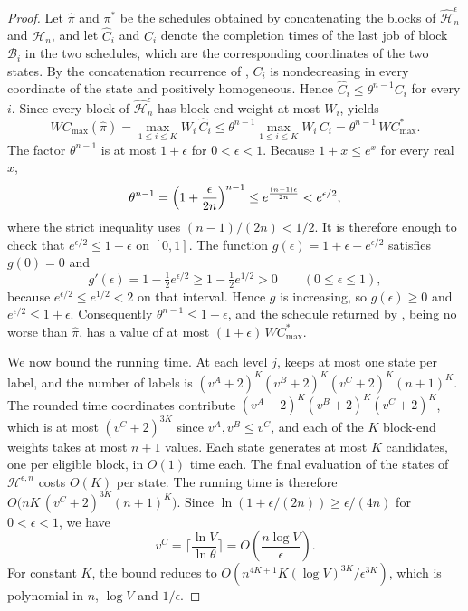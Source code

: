 ﻿\documentclass[12pt]{article}
\begin{document}
\begin{sloppypar}
\begin{proof}
Let $\hat\pi$ and $\pi^{*}$ be the schedules obtained by concatenating the blocks of
$\hat{\mathscr{H}}^{\epsilon}_{n}$ and $\mathscr{H}_{n}$, and let $\hat C_i$ and $C_i$ denote the
completion times of the last job of block $\mathcal{B}_i$ in the two schedules, which are the
corresponding coordinates of the two states. By the concatenation
recurrence of , $C_i$ is nondecreasing in every coordinate
of the state and positively homogeneous. Hence $\hat C_i\le\theta^{n-1}C_i$ for
every $i$. Since every block of $\hat{\mathscr{H}}^{\epsilon}_{n}$ has block-end weight at most
$W_i$,  yields
\[
W C_{\max}(\hat\pi)
=\max_{1\le i\le K}W_i\,\hat C_i
\le \theta^{n-1}\max_{1\le i\le K}W_i\,C_i
=\theta^{n-1}\,W C_{\max}^{*}.
\]
The factor $\theta^{n-1}$ is at most $1+\epsilon$ for $0<\epsilon<1$. Because $1+x\le e^{x}$ for
every real $x$,
\[
\theta^{n-1}=\Bigl(1+\frac{\epsilon}{2n}\Bigr)^{n-1}
\le e^{\frac{(n-1)\epsilon}{2n}}
<e^{\epsilon/2},
\]
where the strict inequality uses $(n-1)/(2n)<1/2$. It is therefore enough to check that
$e^{\epsilon/2}\le1+\epsilon$ on $[0,1]$. The function $g(\epsilon)=1+\epsilon-e^{\epsilon/2}$
satisfies $g(0)=0$ and
\[
g'(\epsilon)=1-\tfrac12 e^{\epsilon/2}\ge 1-\tfrac12 e^{1/2}>0
\qquad(0\le\epsilon\le1),
\]
because $e^{\epsilon/2}\le e^{1/2}<2$ on that interval. Hence $g$ is increasing, so
$g(\epsilon)\ge0$ and $e^{\epsilon/2}\le1+\epsilon$. Consequently $\theta^{n-1}\le1+\epsilon$, and
the schedule returned by , being no worse than $\hat\pi$, has a value of
at most $(1+\epsilon)\,W C_{\max}^{*}$.

We now bound the running time. At each level $j$,  keeps at most one state
per label, and the number of labels is $(v^{A}+2)^K(v^{B}+2)^K(v^{C}+2)^K(n+1)^K$. The rounded time
coordinates contribute $(v^{A}+2)^K(v^{B}+2)^K(v^{C}+2)^K$, which is at most $(v^{C}+2)^{3K}$ since
$v^{A},v^{B}\le v^{C}$, and each of the $K$ block-end weights takes at most $n+1$ values. Each
state generates at most $K$ candidates, one per eligible block, in $O(1)$ time each. The final
evaluation of the states of $\mathscr{H}^{\epsilon,n}$ costs $O(K)$ per state. The running time is
therefore $O\bigl(nK\,(v^{C}+2)^{3K}(n+1)^{K}\bigr)$. Since
$\ln(1+\epsilon/(2n))\ge\epsilon/(4n)$ for $0<\epsilon<1$, we have
\[
v^{C}=\Big\lceil\frac{\ln V}{\ln\theta}\Big\rceil
=O\!\left(\frac{n\log V}{\epsilon}\right).
\]
For constant $K$, the bound reduces to
$O(n^{4K+1}K(\log V)^{3K}/\epsilon^{3K})$, which is polynomial in $n$, $\log V$ and $1/\epsilon$.
\end{proof}


\end{sloppypar}
\end{document}
